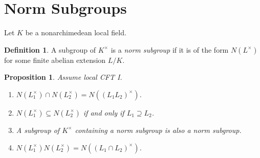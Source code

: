 \documentclass[leqno, openany]{memoir}
\newtheorem{prop}[thm]{Proposition}
\theoremstyle{definition}
\newtheorem{defn}[thm]{Definition}
\theoremstyle{remark}
\theoremstyle{plain}
\theoremstyle{definition}
\theoremstyle{remark}
\begin{document}
\section{Norm Subgroups}%

Let $K$ be a nonarchimedean local field.

\begin{defn} A subgroup of $K^{\times}$ is a \textit{norm subgroup} if it is of
the form $N(L^{\times})$ for some finite abelian extension $L/K$.  \end{defn}

\begin{prop} Assume local CFT I.  \begin{enumerate} \item $N(L_1^{\times}) \cap
    N(L_2^{\times}) = N({(L_1 L_2)}^{\times})$.  \item $N(L_1^{\times})
    \subseteq N(L_2^{\times})$ if and only if $L_1 \supseteq L_2$.  \item A
    subgroup of $K^{\times}$ containing a norm subgroup is also a norm
    subgroup.  \item $N(L_1^{\times}) N(L_2^{\times}) = N({(L_1 \cap
    L_2)}^{\times})$.  \end{enumerate} \end{prop}
\end{document}

